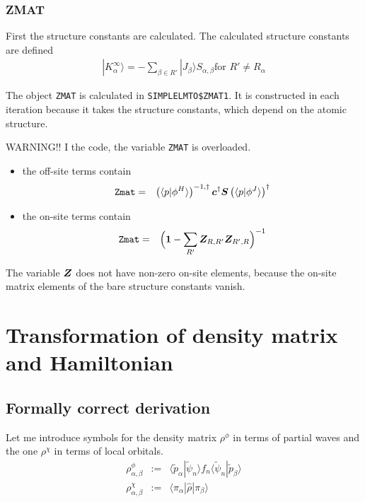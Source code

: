 \documentclass[11pt,a4paper]{report}
\begin{document}
\subsubsection{ZMAT}
First the structure constants are calculated. The calculated structure
constants are defined
\begin{eqnarray}
|K_\alpha^\infty\rangle=-\sum_{\beta\in R'} |J_\beta\rangle S_{\alpha,\beta}
\text{for $R'\neq R_\alpha$}
\end{eqnarray}


The object \verb|ZMAT| is calculated in \verb|SIMPLELMTO$ZMAT1|.  It
is constructed in each iteration because it takes the structure
constants, which depend on the atomic structure.

WARNING!! I the code, the variable \verb|ZMAT| is overloaded. 
\begin{itemize}
\item the off-site terms contain 
\begin{eqnarray}
\verb|Zmat|&=&\left(\langle{p}|\phi^H\rangle\right)^{-1,\dagger}
\mat{c}^\dagger \mat{S} 
\left(\langle{p}|\phi^J\rangle\right)^{\dagger}
\end{eqnarray}
\item the on-site terms contain
\begin{eqnarray}
\verb|Zmat|&=&\Bigl(\mat{1}-\sum_{R'} \mat{Z}_{R,R'}\mat{Z}_{R',R}\Bigr)^{-1}
\end{eqnarray}
\end{itemize}
The variable $\bm{Z}$ does not have non-zero on-site elements,
because the on-site matrix elements of the bare structure constants
vanish.

\section{Transformation of density matrix and Hamiltonian}
\subsection{Formally correct derivation}
Let me introduce symbols for the density matrix $\rho^\phi$ in terms
of partial waves and the one $\rho^\chi$ in terms of local orbitals.
\begin{eqnarray}
\rho^\phi_{\alpha,\beta}&:=&\langle\tilde{p}_\alpha|\tilde{\psi}_n\rangle
f_n\langle\tilde{\psi}_n|\tilde{p}_\beta\rangle
\nonumber\\
\rho^\chi_{\alpha,\beta}&:=&\langle\pi_\alpha|\hat{\rho}|\pi_\beta\rangle
\end{eqnarray}
\end{document}
